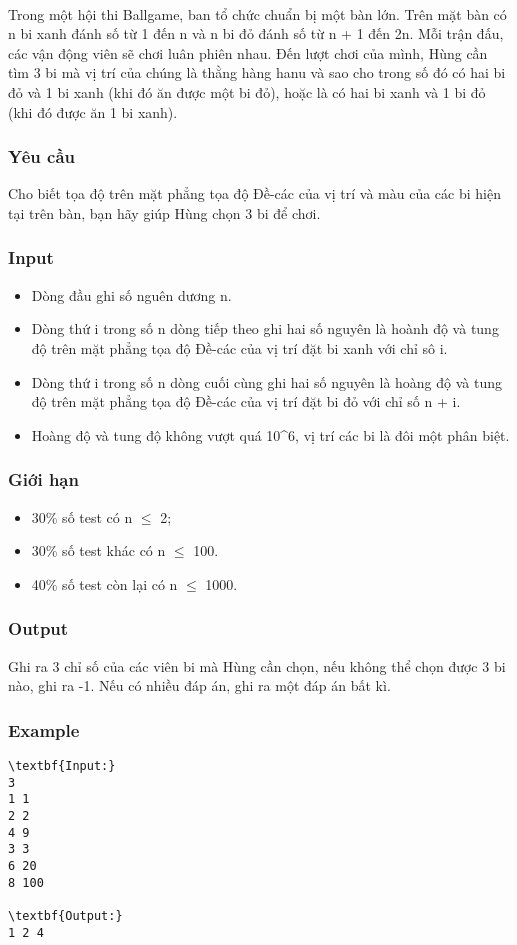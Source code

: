 

 

Trong một hội thi Ballgame, ban tổ chức chuẩn bị một bàn lớn. Trên mặt bàn có n bi xanh đánh số từ 1 đến n và n bi đỏ đánh số từ n + 1 đến 2n. Mỗi trận đấu, các vận động viên sẽ chơi luân phiên nhau. Đến lượt chơi của mình, Hùng cần tìm 3 bi mà vị trí của chúng là thằng hàng hanu và sao cho trong số đó có hai bi đỏ và 1 bi xanh (khi đó ăn được một bi đỏ), hoặc là có hai bi xanh và 1 bi đỏ (khi đó được ăn 1 bi xanh).

\subsubsection{Yêu cầu}

Cho biết tọa độ trên mặt phẳng tọa độ Đề-các của vị trí và màu của các bi hiện tại trên bàn, bạn hãy giúp Hùng chọn 3 bi để chơi.

\subsubsection{Input}
\begin{itemize}
	\item Dòng đầu ghi số nguên dương n.
	\item Dòng thứ i trong số n dòng tiếp theo ghi hai số nguyên là hoành độ và tung độ trên mặt phẳng tọa độ Đề-các của vị trí đặt bi xanh với chỉ sô i.
	\item Dòng thứ i trong số n dòng cuối cùng ghi hai số nguyên là hoàng độ và tung độ trên mặt phẳng tọa độ Đề-các của vị trí đặt bi đỏ với chỉ số n + i.
	\item Hoàng độ và tung độ không vượt quá 10^6, vị trí các bi là đôi một phân biệt.
\end{itemize}

\subsubsection{Giới hạn}
\begin{itemize}
	\item 30\% số test có n  $\le$  2;
	\item 30\% số test khác có n  $\le$  100.
	\item 40\% số test còn lại có n  $\le$  1000.
\end{itemize}

\subsubsection{Output}

Ghi ra 3 chỉ số của các viên bi mà Hùng cần chọn, nếu không thể chọn được 3 bi nào, ghi ra -1. Nếu có nhiều đáp án, ghi ra một đáp án bất kì.

\subsubsection{Example}
\begin{verbatim}
\textbf{Input:}
3
1 1
2 2
4 9
3 3
6 20
8 100

\textbf{Output:}
1 2 4
\end{verbatim}
